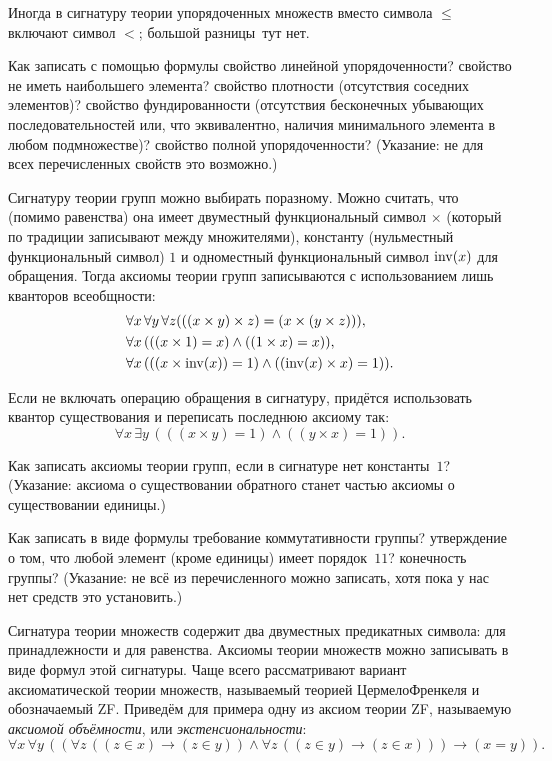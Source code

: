 Иногда в сигнатуру теории упорядоченных множеств вместо символа
$\le$ включают символ $<$; большой разницы~тут нет.

\begin{problem}
Как записать с помощью формулы свойство линейной
упорядоченности? свойство не иметь наибольшего элемента?
свойство плотности (отсутствия соседних элементов)? свойство
фундированности (отсутствия бесконечных убывающих последовательностей\т
или, что эквивалентно, наличия минимального элемента в любом подмножестве)?
свойство полной упорядоченности? (Указание: не
для всех перечисленных свойств это возможно.)
\end{problem}

Сигнатуру теории групп можно выбирать по\д разному. Можно
считать, что (помимо равенства) она имеет двуместный
функциональный символ $\times$ (который по традиции записывают
между множителями), константу (нульместный функциональный
символ) $1$ и одноместный функциональный символ $\operatorname{inv}(x)$ для
обращения. Тогда аксиомы теории групп записываются с
использованием лишь кванторов всеобщности:
        \begin{align*}
&\forall x\,\forall y\,\forall z
      (((x\times y)\times z)=(x\times(y\times z))),\\
&\forall x\, (((x\times 1)= x)\land((1\times x)=x)),\\
&\forall x\, (((x\times \operatorname{inv}(x))= 1)\land((\operatorname{inv}(x)\times x)=1)).
        \end{align*}

Если не включать операцию обращения в сигнатуру, придётся
использовать квантор существования и переписать последнюю
аксиому так:
        $$
\forall x\, \exists y\,((( x\times y)= 1)\land((y\times x)=1)).
        $$

\begin{problem}
Как записать аксиомы теории групп, если в сигнатуре нет константы~$1$?
(Указание: аксиома о существовании обратного станет частью аксиомы
о существовании единицы.)
\end{problem}

\begin{problem}
Как записать в виде формулы требование коммутативности
группы? утверждение о том, что любой элемент (кроме единицы)
имеет порядок~$11$? конечность группы? (Указание: не всё из
перечисленного можно записать, хотя пока у нас нет средств это
установить.)
\end{problem}

Сигнатура теории множеств содержит два двуместных предикатных
символа: для принадлежности и для равенства. Аксиомы теории
множеств можно записывать в виде формул этой сигнатуры. Чаще
всего рассматривают вариант аксиоматической теории множеств,
называемый теорией Цермело\ч Френкеля%
%
%
и обозначаемый ZF.%
Приведём для примера одну из аксиом теории ZF, называемую
\emph{аксиомой объёмности}, или \emph{экстенсиональности}:%
$$
\forall x\,\forall y\,((\forall z\,((z\in x)\to(z\in y))\land
                        \forall z\,((z\in y)\to(z\in x))) \to (x=y)).
$$

